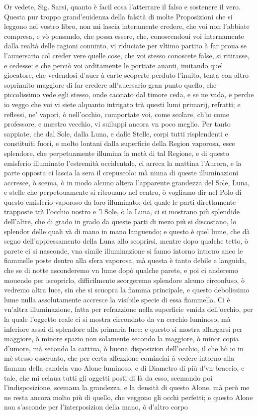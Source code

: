 \documentclass[11pt,twoside,openany]{book}
\begin{document}
Or vedete, Sig. Sarsi, quanto è facil cosa l'atterrare il falso e sostenere il vero. Questa pur troppo grand'euidenza della falsità di molte Proposizioni che si leggono nel vostro libro, non mi lascia interamente credere, che voi non l'abbiate compresa, e vò pensando, che possa essere, che, conoscendoui voi internamente dalla realtà delle ragioni conuinto, vi riduciate per vltimo partito à far proua se l'auuersario col creder vere quelle cose, che voi stesso conoscete false, si ritirasse, e cedesse; e che perciò voi arditamente le portiate auanti, imitando quel giocatore, che vedendosi d'auer à carte scoperte perduto l'inuito, tenta con altro soprinuito maggiore di far credere all'auersario gran punto quello, che piccolissimo vede egli stesso, onde cacciato dal timore ceda, e se ne vada, e perche io veggo che voi vi siete alquanto intrigato trà questi lumi primarij, refratti; e reflessi, ne' vapori, ò nell'occhio, comportate voi, come scolare, ch'io come professore, e mæstro vecchio, vi suiluppi ancora vn poco meglio. Per tanto sappiate, che dal Sole, dalla Luna, e dalle Stelle, corpi tutti risplendenti e constituiti fuori, e molto lontani dalla superficie della Region vaporosa, esce splendore, che perpetuamente illumina la metà di tal Regione, e di questo emisferio illuminato l'estremità occidentale, ci arreca la mattina l'Aurora, e la parte opposta ci lascia la sera il crepuscolo: mà niuna di queste illuminazioni accresce, ò scema, ò in modo alcuno altera l'apparente grandezza del Sole, Luna, e stelle che perpetouamente si ritrouano nel centro, ò vogliamo dir nel Polo di questo emisferio vaporoso da loro illuminato; del quale le parti direttamente trapposte trà l'occhio nostro e 'l Sole, ò la Luna, ci si mostrano più splendide dell'altre, che di grado in grado da queste parti di mezo più si discostano, lo splendor delle quali và di mano in mano languendo; e questo è quel lume, che dà segno dell'appressamento della Luna allo scoprirsi, mentre dopo qualche tetto, ò parete ci si nasconde, vna simile illuminazione si fanno intorno intorno anco le fiammelle poste dentro alla sfera vaporosa, mà questa è tanto debile e languida, che se di notte asconderemo vn lume dopò qualche parete, e poi ci anderemo mouendo per iscoprirlo, difficilmente scorgeremo splendore alcuno circonfuso, ò vedremo altra luce, sin che si scuopra la fiamma principale, e questo debolissimo lume nulla assolutamente accresce la visibile specie di essa fiammella. Ci è vn'altra illuminazione, fatta per refrazzione nella superficie vmida dell'occhio, per la quale l'oggetto reale ci si mostra circondato da vn cerchio luminoso, mà inferiore assai di splendore alla primaria luce: e questo si mostra allargarsi per maggiore, ò minore spazio non solamente secondo la maggiore, ò minor copia d'umore, mà secondo la cattiua, ò buona disposizion dell'occhio, il che hò io in mè stesso osseruato, che per certa affezzione cominciai à vedere intorno alla fiamma della candela vno Alone luminoso, e di Diametro di più d'vn braccio, e tale, che mi celaua tutti gli oggetti posti di là da esso, scemando poi l'indisposizione, scemaua la grandezza, e la densità di questo Alone, mà però me ne resta ancora molto più di quello, che veggono gli occhi perfetti; e questo Alone non s'asconde per l'interposizion della mano, ò d'altro corpo 
\end{document}
